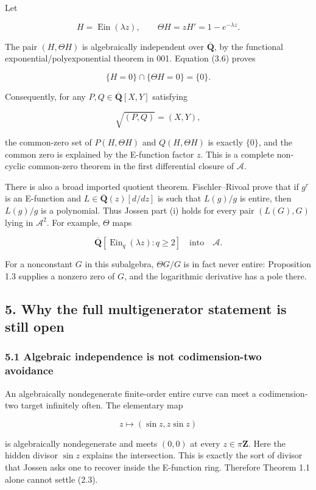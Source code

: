 Let

\[
  H=\operatorname{Ein}(\lambda z),\qquad
  \Theta H=zH'=1-e^{-\lambda z}.
\]

The pair \((H,\Theta H)\) is algebraically independent over
\(\overline{\mathbf Q}\), by the functional exponential/polyexponential
theorem in 001. Equation (3.6) proves

\[
  \{H=0\}\cap\{\Theta H=0\}=\{0\}.                          \tag{J-4.1}
\]

Consequently, for any \(P,Q\in\overline{\mathbf Q}[X,Y]\) satisfying

\[
  \sqrt{(P,Q)}=(X,Y),                                       \tag{J-4.2}
\]

the common-zero set of \(P(H,\Theta H)\) and
\(Q(H,\Theta H)\) is exactly \(\{0\}\), and the common zero is explained by
the E-function factor \(z\). This is a complete non-cyclic common-zero
theorem in the first differential closure of \(\mathscr A\).

There is also a broad imported quotient theorem. Fischler--Rivoal prove that
if \(g^r\) is an E-function and \(L\in\overline{\mathbf Q}(z)[d/dz]\) is such
that \(L(g)/g\) is entire, then \(L(g)/g\) is a polynomial. Thus Jossen part
(i) holds for every pair \((L(G),G)\) lying in \(\mathscr A^2\). For example,
\(\Theta\) maps

\[
 \overline{\mathbf Q}[\operatorname{Ein}_q(\lambda z):q\ge2]
 \quad\text{into}\quad\mathscr A.
\]

For a nonconstant \(G\) in this subalgebra, \(\Theta G/G\) is in fact never
entire: Proposition 1.3 supplies a nonzero zero of \(G\), and the logarithmic
derivative has a pole there.

\subsection{5. Why the full multigenerator statement is still open}

\subsubsection{5.1 Algebraic independence is not codimension-two avoidance}

An algebraically nondegenerate finite-order entire curve can meet a
codimension-two target infinitely often. The elementary map

\[
  z\longmapsto(\sin z,z\sin z)
\]

is algebraically nondegenerate and meets \((0,0)\) at every \(z\in\pi\mathbf Z\).
Here the hidden divisor \(\sin z\) explains the intersection. This is exactly
the sort of divisor that Jossen asks one to recover inside the E-function
ring. Therefore Theorem 1.1 alone cannot settle (2.3).

